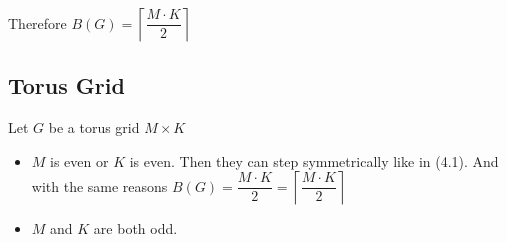 \documentclass[12pt,a4paper, flushleft]{article}
\newcommand{\ceil}[1]{\left\lceil #1 \right\rceil}
\begin{document}
Therefore $B(G) = \ceil{\dfrac{M\cdot K}{2}}$

\subsection{Torus Grid}
Let $G$ be a torus grid $M\times K$

\begin{itemize}
	\item $M$ is even or $K$ is even. Then they can step symmetrically like in (4.1). And with the same reasons $B(G) = \dfrac{M\cdot K}{2} = \ceil{\dfrac{M\cdot K}{2}}$
	\item $M$ and $K$ are both odd. 
\end{itemize}
\end{document}
